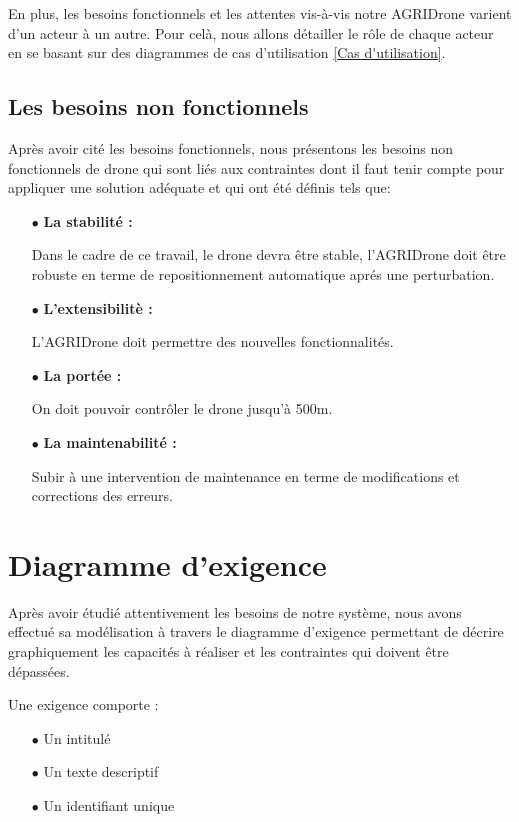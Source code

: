 En plus, les besoins fonctionnels et les attentes vis-à-vis notre AGRIDrone varient d'un acteur à un autre. Pour celà, nous allons détailler le rôle de chaque acteur en se basant sur des diagrammes de cas d'utilisation \ref{Cas d'utilisation}.

\subsection{Les besoins non fonctionnels}
Après avoir cité les besoins fonctionnels, nous présentons
les besoins non fonctionnels de drone qui sont liés aux contraintes dont il faut tenir compte pour appliquer une solution adéquate et qui ont été définis tels que:
\begin{itemize}
	\item [$\bullet$] \textbf{La stabilité :}
	
	
	Dans le cadre de ce travail, le drone devra être stable, l'AGRIDrone doit être robuste en terme de repositionnement automatique aprés une perturbation.	
	\clearpage
	\item [$\bullet$] \textbf{L'extensibilitè : }
	
	
	L'AGRIDrone doit permettre des nouvelles fonctionnalités.
	
	\item [$\bullet$] \textbf{La portée : } 
	
	
	On doit pouvoir contrôler le drone jusqu'à 500m.
	
	
	\item [$\bullet$] \textbf{La maintenabilité : }  
	
	Subir à une intervention de maintenance en terme de modifications et corrections des erreurs.
	\end {itemize}

	\section{Diagramme d'exigence }
	Après avoir étudié attentivement les besoins de  notre système, nous avons effectué sa modélisation à travers le diagramme d'exigence permettant de décrire graphiquement les capacités à réaliser et les contraintes qui doivent être dépassées.
	
	Une exigence comporte : 
	\begin{itemize}
		\item [$\bullet$] Un intitulé 
		
		\item [$\bullet$]Un texte descriptif 
		
		\item [$\bullet$]Un identifiant unique
	\end{itemize}
	
